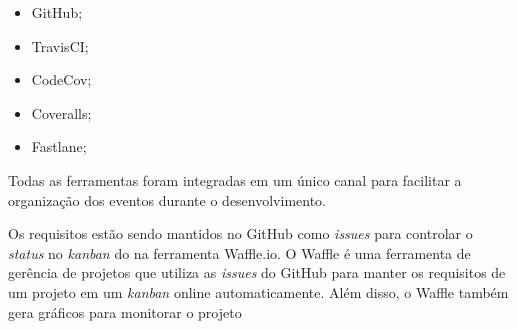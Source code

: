 \begin{itemize}
    \item GitHub;
    \item TravisCI;
    \item CodeCov;
    \item Coveralls;
    \item Fastlane;
\end{itemize}

Todas as ferramentas foram integradas em um único canal para facilitar a organização dos eventos durante o desenvolvimento.

Os requisitos estão sendo mantidos no GitHub como \textit{issues} para controlar o \textit{status} no \textit{kanban} do  na ferramenta Waffle.io. O Waffle é uma ferramenta de gerência de projetos que utiliza as \textit{issues} do GitHub para manter os requisitos de um projeto em um \textit{kanban} online automaticamente. Além disso, o Waffle também gera gráficos para monitorar o projeto \cite{waffle-ca}
